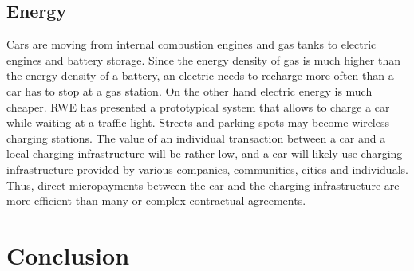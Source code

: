 \subsection{Energy}

Cars are moving from internal combustion engines and gas tanks to electric engines and battery storage. Since the energy density of gas is much higher than the energy density of a battery, an electric needs to recharge more often than a car has to stop at a gas station. On the other hand electric energy is much cheaper. RWE has presented a prototypical system that allows to charge a car while waiting at a traffic light. Streets and parking spots may become wireless charging stations. The value of an individual transaction between a car and a local charging infrastructure will be rather low, and a car will likely use charging infrastructure provided by various companies, communities, cities and individuals. Thus, direct micropayments between the car and the charging infrastructure are more efficient than many or complex contractual agreements.


\section{Conclusion}











